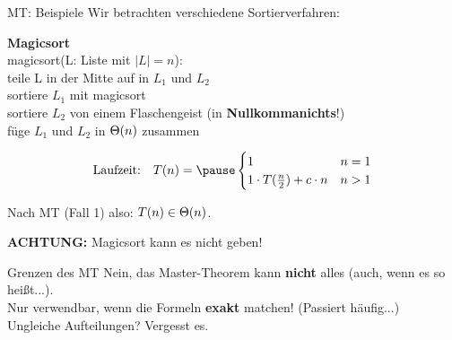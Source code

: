 \begin{frame}[t]{MT: Beispiele}
	Wir betrachten verschiedene Sortierverfahren:\\
	\bigskip
	
	\textbf{Magicsort}\\
	magicsort(L: Liste mit $|L| = n$):\\
	\quad teile L in der Mitte auf in $L_1$ und $L_2$\\
	\quad sortiere $L_1$ mit magicsort\\
	\quad sortiere $L_2$ von einem Flaschengeist (in \textbf{Nullkommanichts}!)\\
	\quad füge $L_1$ und $L_2$ in $\Theta\!\left(n\right)$ zusammen\\
	\medskip
	
	$$\text{Laufzeit:} \quad T(n) = \pause \begin{cases}
	1 & n = 1\\
	1 \cdot T(\fract n/2 ) + c \cdot n & n > 1
	\end{cases}$$
	
	\pause
	Nach MT (Fall 1) also: $T(n) \in \Theta\!\left(n\right)$.
	\medskip
	
	\textbf{ACHTUNG:} Magicsort kann es nicht geben!
\end{frame}


\begin{frame}{Grenzen des MT}
	Nein, das Master-Theorem kann \textbf{nicht} alles (auch, wenn es so heißt...). \\
	\smallskip
	\impl Nur verwendbar, wenn die Formeln \textbf{exakt} matchen! (Passiert häufig...) \\
	\medskip
	Ungleiche Aufteilungen? Vergesst es. \\
	
	
	
\end{frame}